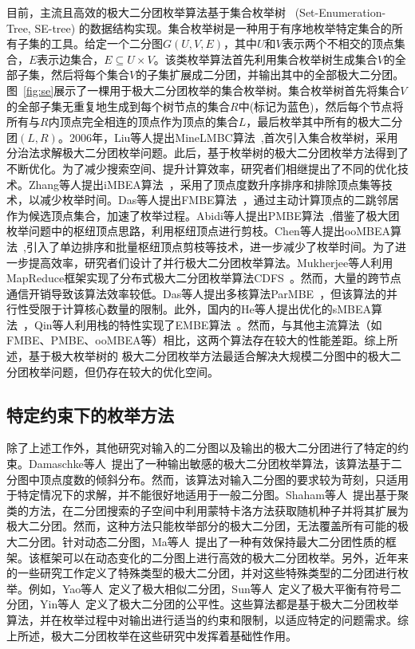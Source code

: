 目前，主流且高效的极大二分团枚举算法基于集合枚举树~\cite{SEtree92} (Set-Enumeration-Tree, SE-tree) 的数据结构实现。集合枚举树是一种用于有序地枚举特定集合的所有子集的工具。给定一个二分图$G(U, V, E)$，其中$U$和$V$表示两个不相交的顶点集合，$E$表示边集合，$E \subseteq U \times V$。该类枚举算法首先利用集合枚举树生成集合$V$的全部子集，然后将每个集合$V$的子集扩展成二分团，并输出其中的全部极大二分团。图~\ref{fig:se}展示了一棵用于极大二分团枚举的集合枚举树。集合枚举树首先将集合$V$的全部子集无重复地生成到每个树节点的集合$R$中(标记为蓝色)，然后每个节点将所有与$R$内顶点完全相连的顶点作为顶点的集合$L$，最后枚举其中所有的极大二分团$(L,R)$。2006年，Liu等人提出MineLMBC算法~\cite{minel06},首次引入集合枚举树，采用分治法求解极大二分团枚举问题。此后，基于枚举树的极大二分团枚举方法得到了不断优化。为了减少搜索空间、提升计算效率，研究者们相继提出了不同的优化技术。Zhang等人提出iMBEA算法~\cite{iMBEA14}，采用了顶点度数升序排序和排除顶点集等技术，以减少枚举时间。Das等人提出FMBE算法~\cite{parMBE18}，通过主动计算顶点的二跳邻居作为候选顶点集合，加速了枚举过程。Abidi等人提出PMBE算法~\cite{PMBE20},借鉴了极大团枚举问题中的枢纽顶点思路，利用枢纽顶点进行剪枝。Chen等人提出ooMBEA算法~\cite{ooMBE22},引入了单边排序和批量枢纽顶点剪枝等技术，进一步减少了枚举时间。为了进一步提高效率，研究者们设计了并行极大二分团枚举算法。Mukherjee等人利用MapReduce框架实现了分布式极大二分团枚举算法CDFS~\cite{mapreduceMBE16}。然而，大量的跨节点通信开销导致该算法效率较低。Das等人提出多核算法ParMBE~\cite{parMBE18}，但该算法的并行性受限于计算核心数量的限制。此外，国内的He等人提出优化的sMBEA算法~\cite{MBEHe18}，Qin等人利用栈的特性实现了EMBE算法~\cite{MBEQin20}。然而，与其他主流算法（如FMBE、PMBE、ooMBEA等）相比，这两个算法存在较大的性能差距。综上所述，基于极大枚举树的
极大二分团枚举方法最适合解决大规模二分图中的极大二分团枚举问题，但仍存在较大的优化空间。

\subsection{特定约束下的枚举方法}

除了上述工作外，其他研究对输入的二分图以及输出的极大二分团进行了特定的约束。Damaschke等人~\cite{Damaschke14}提出了一种输出敏感的极大二分团枚举算法，该算法基于二分图中顶点度数的倾斜分布。然而，该算法对输入二分图的要求较为苛刻，只适用于特定情况下的求解，并不能很好地适用于一般二分图。Shaham等人~\cite{Shaham16}提出基于聚类的方法，在二分团搜索的子空间中利用蒙特卡洛方法获取随机种子并将其扩展为极大二分团。然而，这种方法只能枚举部分的极大二分团，无法覆盖所有可能的极大二分团。针对动态二分图，Ma等人~\cite{Ma22}提出了一种有效保持最大二分团性质的框架。该框架可以在动态变化的二分图上进行高效的极大二分团枚举。另外，近年来的一些研究工作定义了特殊类型的极大二分团，并对这些特殊类型的二分团进行枚举。例如，Yao等人~\cite{SimilarMBE22}定义了极大相似二分团，Sun等人~\cite{Sun22}定义了极大平衡有符号二分团，Yin等人~\cite{FairMBE23}定义了极大二分团的公平性。这些算法都是基于极大二分团枚举算法，并在枚举过程中对输出进行适当的约束和限制，以适应特定的问题需求。综上所述，极大二分团枚举在这些研究中发挥着基础性作用。


